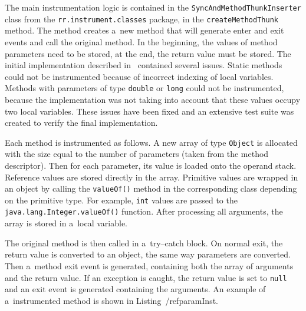 The main instrumentation logic is contained in the
\texttt{SyncAndMethodThunkInserter} class from the
\texttt{rr.instrument.classes} package, in the \texttt{createMethodThunk}
method. The method creates a~new method that will generate enter and exit events
and call the original method. In the beginning, the values of method parameters
need to be stored, at the end, the return value must be stored. The initial
implementation described in~\cite{janousek} contained several issues. Static
methods could not be instrumented because of incorrect indexing of local
variables. Methods with parameters of type \texttt{double} or \texttt{long}
could not be instrumented, because the implementation was not taking into
account that these values occupy two local variables. These issues have been
fixed and an extensive test suite was created to verify the final
implementation.

Each method is instrumented as follows. A new array of type \texttt{Object} is
allocated with the size equal to the number of parameters (taken from the method
descriptor). Then for each parameter, its value is loaded onto the operand
stack. Reference values are stored directly in the array. Primitive values are
wrapped in an object by calling the \texttt{valueOf()} method in the
corresponding class depending on the primitive type. For example, \texttt{int}
values are passed to the \texttt{java.lang.Integer.valueOf()} function. After
processing all arguments, the array is stored in a~local variable.

The original method is then called in a~try--catch block. On normal exit, the
return value is converted to an object, the same way parameters are converted.
Then a~method exit event is generated, containing both the array of arguments
and the return value. If an exception is caught, the return value is set to
\texttt{null} and an exit event is generated containing the arguments. An
example of a~instrumented method is shown in Listing~/ref{paramInst}.

